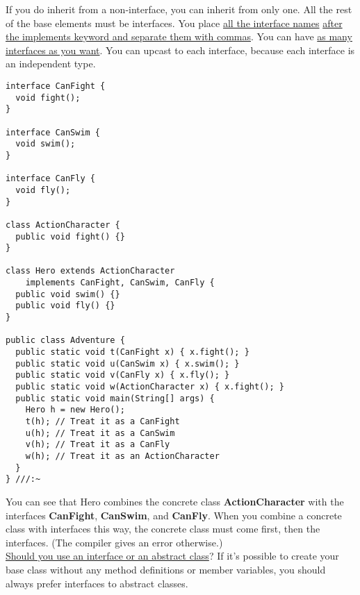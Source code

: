 \documentclass[10pt,letterpaper]{report}
\begin{document}
If you do inherit from a non-interface, you can inherit from only one. All the rest of the base elements must be interfaces. You place \underline{all the interface names} \underline{after the implements keyword and separate them with commas}. You can have \underline{as many interfaces as you want}. You can upcast to each interface, because each interface is an independent type.
\begin{lstlisting}
interface CanFight {
  void fight();
}

interface CanSwim {
  void swim();
}

interface CanFly {
  void fly();
}

class ActionCharacter {
  public void fight() {}
}	

class Hero extends ActionCharacter
    implements CanFight, CanSwim, CanFly {
  public void swim() {}
  public void fly() {}
}

public class Adventure {
  public static void t(CanFight x) { x.fight(); }
  public static void u(CanSwim x) { x.swim(); }
  public static void v(CanFly x) { x.fly(); }
  public static void w(ActionCharacter x) { x.fight(); }
  public static void main(String[] args) {
    Hero h = new Hero();
    t(h); // Treat it as a CanFight
    u(h); // Treat it as a CanSwim
    v(h); // Treat it as a CanFly
    w(h); // Treat it as an ActionCharacter
  }
} ///:~
\end{lstlisting}
You can see that Hero combines the concrete class \textbf{ActionCharacter} with the interfaces \textbf{CanFight}, \textbf{CanSwim}, and \textbf{CanFly}. When you combine a concrete class with interfaces this way, the concrete class must come first, then the interfaces. (The compiler gives an error otherwise.)\\

\underline{Should you use an interface or an abstract class}? If it's possible to create your base class without any method definitions or member variables, you should always prefer interfaces to abstract classes.
\end{document}
